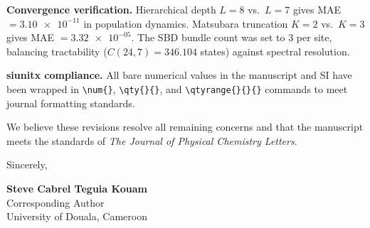\documentclass[11pt]{article}
\begin{document}
\textbf{Convergence verification.} Hierarchical depth $L=8$ vs.\ $L=7$ gives MAE $= \num{3.10e-11}$ in population dynamics. Matsubara truncation $K=2$ vs.\ $K=3$ gives MAE $= \num{3.32e-05}$. The SBD bundle count was set to 3 per site, balancing tractability ($C(24,7) = \num{346,104}$ states) against spectral resolution.

\textbf{siunitx compliance.} All bare numerical values in the manuscript and SI have been wrapped in \texttt{\textbackslash num\{\}}, \texttt{\textbackslash qty\{\}\{\}}, and \texttt{\textbackslash qtyrange\{\}\{\}\{\}} commands to meet journal formatting standards.

We believe these revisions resolve all remaining concerns and that the manuscript meets the standards of \textit{The Journal of Physical Chemistry Letters}.

\vspace{1.5em}

\noindent Sincerely,

\vspace{2.5em}

\noindent \textbf{Steve Cabrel Teguia Kouam}\\
Corresponding Author\\
University of Douala, Cameroon
\end{document}

